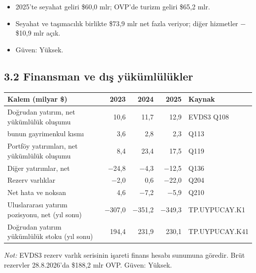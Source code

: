 \begin{enumerate}
  \begin{itemize}
  \tightlist
  \item
    2025'te seyahat geliri \$60,0 mlr; OVP'de turizm geliri \$65,2 mlr.
  \item
    Seyahat ve taşımacılık birlikte \$73,9 mlr net fazla veriyor; diğer hizmetler −\$10,9 mlr açık.
  \item
    \etiketV{} Güven: Yüksek.
  \end{itemize}
\end{enumerate}

\hypertarget{01_teshis-32-finansman-ve-dux131ux15f-yuxfckuxfcmluxfcluxfckler}{%
\subsection{3.2 Finansman ve dış yükümlülükler}\label{01_teshis-32-finansman-ve-dux131ux15f-yuxfckuxfcmluxfcluxfckler}}

\begingroup\gbtablo\footnotesize

\begin{longtable}[]{@{}lrrrl@{}}
\toprule\noalign{}
\textbf{Kalem (milyar \$)} & \textbf{2023} & \textbf{2024} & \textbf{2025} & \textbf{Kaynak} \\
\midrule\noalign{}
\endhead
\bottomrule\noalign{}
\endlastfoot
Doğrudan yatırım, net yükümlülük oluşumu & 10,6 & 11,7 & 12,9 & \etiketV{} EVDS3 Q108 \\
bunun gayrimenkul kısmı & 3,6 & 2,8 & 2,3 & \etiketV{} Q113 \\
Portföy yatırımları, net yükümlülük oluşumu & 8,4 & 23,4 & 17,5 & \etiketV{} Q119 \\
Diğer yatırımlar, net & −24,8 & −4,3 & −12,5 & \etiketV{} Q136 \\
Rezerv varlıklar & −2,0 & 0,6 & −22,0 & \etiketV{} Q204 \\
Net hata ve noksan & 4,6 & −7,2 & −5,9 & \etiketV{} Q210 \\
Uluslararası yatırım pozisyonu, net (yıl sonu) & −307,0 & −351,2 & −349,3 & \etiketV{} TP.UYPUCAY.K1 \\
Doğrudan yatırım yükümlülük stoku (yıl sonu) & 194,4 & 231,9 & 230,1 & \etiketV{} TP.UYPUCAY.K41 \\
\end{longtable}

\endgroup

\emph{Not:} EVDS3 rezerv varlık serisinin işareti finans hesabı sunumuna göredir. Brüt rezervler 28.8.2026'da \$188,2 mlr \etiketV{} OVP. Güven: Yüksek.

